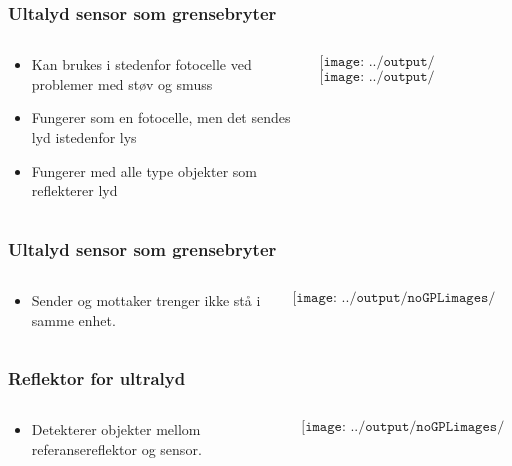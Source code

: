 \documentclass[aspectratio=169,xcolor=dvipsnames]{beamer}
\begin{document}
\begin{frame}
	\frametitle{Ultalyd sensor som grensebryter}
	\begin{columns}
		\begin{column}{0.5\textwidth}
			\begin{itemize}
				\item Kan brukes i stedenfor fotocelle ved problemer med støv og smuss
				\item Fungerer som en fotocelle, men det sendes lyd istedenfor lys
				\item Fungerer med alle type objekter som reflekterer lyd
	
			\end{itemize}

			
		\end{column}

		\begin{column}{0.5\textwidth}
	$$\texttt{[image: ../output/noGPLimages/limit33.png]}$$
	$$\texttt{[image: ../output/noGPLimages/limit34.png]}$$
		\end{column}
	\end{columns}
\end{frame}
\begin{frame}
	\frametitle{Ultalyd sensor som grensebryter}
	\begin{columns}
		\begin{column}{0.5\textwidth}
			\begin{itemize}
				\item Sender og mottaker trenger ikke stå i samme enhet. 
			\end{itemize}

			
		\end{column}

		\begin{column}{0.5\textwidth}
	$$\texttt{[image: ../output/noGPLimages/limit35.png]}$$
		\end{column}
	\end{columns}
\end{frame}
\begin{frame}
	\frametitle{Reflektor for ultralyd}
	\begin{columns}
		\begin{column}{0.5\textwidth}
			\begin{itemize}
				\item Detekterer objekter mellom referansereflektor og sensor. 
			\end{itemize}

			
		\end{column}

		\begin{column}{0.5\textwidth}
	$$\texttt{[image: ../output/noGPLimages/limit36.png]}$$
		\end{column}
	\end{columns}
\end{frame}
\end{document}
